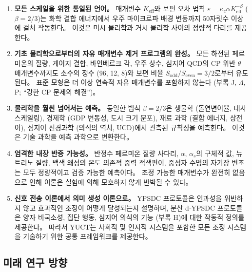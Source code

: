 \documentclass[11pt,a4paper]{article}
\begin{document}
\begin{enumerate}
\item \textbf{모든 스케일을 위한 통일된 언어。} 매개변수 \(K_{\mathrm{eff}}\)와 보편 오차 법칙 \(\varepsilon = \kappa_c \alpha K_{\mathrm{eff}}^{-\beta}\) (\(\beta = 2/3\))는 화학 결합 에너지에서 우주 마이크로파 배경 변동까지 50자릿수 이상에 걸쳐 작동한다。 이것은 미시 물리학과 거시 물리학 사이의 정량적 다리를 제공한다。

\item \textbf{기초 물리학으로부터의 자유 매개변수 제거 프로그램의 완성。} 모든 하전된 페르미온의 질량, 게이지 결합, 바인베르크 각, 우주 상수, 심지어 QCD의 CP 위반 \(\theta\) 매개변수까지도 소수의 정수 (96, 12, 8)와 보편 비율 \(S_{\mathrm{odd}}/S_{\mathrm{even}} = 3/2\)로부터 유도된다。 표준 모형은 더 이상 연속적 자유 매개변수를 포함하지 않는다 (부록 J, \(\Lambda\), P; ``강한 CP 문제의 해결'')。

\item \textbf{물리학을 훨씬 넘어서는 예측。} 동일한 법칙 \(\beta = 2/3\)은 생물학 (돌연변이율, 대사 스케일링), 경제학 (GDP 변동성, 도시 크기 분포), 재료 과학 (결합 에너지, 상전이), 심지어 신경과학 (의식의 역치, UCD)에서 관측된 규칙성을 예측한다。 이것은 기술 과학을 예측 과학으로 변환한다。

\item \textbf{엄격한 내장 반증 가능성。} 반정수 페르미온 질량 사다리, \(\alpha\), \(\alpha_s\)의 구체적 값, 뉴트리노 질량, 백색 왜성의 온도 의존적 중력 적색편이, 중성자 수명의 자기장 변조는 모두 정량적이고 검증 가능한 예측이다。 조정 가능한 매개변수가 완전히 없음으로 인해 이론은 실험에 의해 모호하지 않게 반박될 수 있다。

\item \textbf{신호 전송 이론에서 의미 생성 이론으로。} YPSDC 프로토콜은 인과성을 위반하지 않고 효과적인 조정이 어떻게 달성되는지 설명하며, 분산 d‑YPSDC 프로토콜은 양자 비국소성, 집단 행동, 심지어 의식의 기능 (부록 H)에 대한 작동적 정의를 제공한다。 따라서 YUCT는 사회적 및 인지적 시스템을 포함한 모든 조정 시스템을 기술하기 위한 공통 프레임워크를 제공한다。
\end{enumerate}

\subsection{미래 연구 방향}
\end{document}
